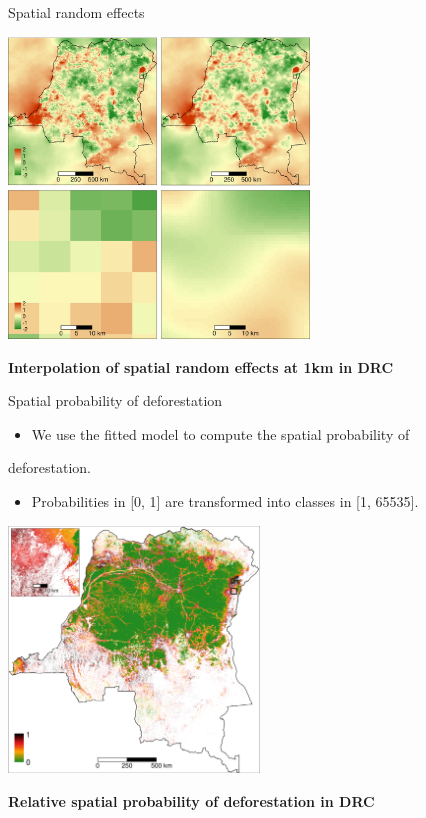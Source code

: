 \documentclass[10pt,table,dvipsnames,compress]{beamer}
\begin{document}
\begin{frame}[label={sec:org1ad1a41}]{Spatial random effects}
\begin{center}
\includegraphics[width=0.6\textwidth]{figs/sm/rho.png}
\end{center}

\centering \textbf{Interpolation of spatial random effects at 1km in DRC}
\end{frame}

\begin{frame}[label={sec:orgfcc2a82}]{Spatial probability of deforestation}
\begin{itemize}
\item We use the fitted model to compute the spatial probability of
\end{itemize}
deforestation.
\begin{itemize}
\item Probabilities in [0, 1] are transformed into classes in [1, 65535].
\end{itemize}

\begin{center}
\includegraphics[width=0.5\textwidth]{figs/sm/prob.png}
\end{center}

\centering \textbf{Relative spatial probability of deforestation in DRC}
\end{frame}
\end{document}
